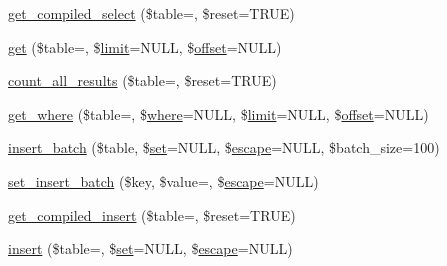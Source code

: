 \begin{DoxyCompactItemize}
\item 
\mbox{\hyperlink{class_c_i___d_b__query__builder_a0c676ca7dd63a7c77741a154e9acf936}{get\+\_\+compiled\+\_\+select}} (\$table=\textquotesingle{}\textquotesingle{}, \$reset=T\+R\+UE)
\item 
\mbox{\hyperlink{class_c_i___d_b__query__builder_a2e2e9087b1d03de3f39b4167f85e7721}{get}} (\$table=\textquotesingle{}\textquotesingle{}, \$\mbox{\hyperlink{class_c_i___d_b__query__builder_a1b72e2941924e573f5efb95f8dbc9815}{limit}}=N\+U\+LL, \$\mbox{\hyperlink{class_c_i___d_b__query__builder_a20768a139b4c62547f6fb4b55d5c734f}{offset}}=N\+U\+LL)
\item 
\mbox{\hyperlink{class_c_i___d_b__query__builder_aa686896c05027f6c8fe09b2da750357f}{count\+\_\+all\+\_\+results}} (\$table=\textquotesingle{}\textquotesingle{}, \$reset=T\+R\+UE)
\item 
\mbox{\hyperlink{class_c_i___d_b__query__builder_a95fc7bf89bf11f501b9cdba3c475e23c}{get\+\_\+where}} (\$table=\textquotesingle{}\textquotesingle{}, \$\mbox{\hyperlink{class_c_i___d_b__query__builder_ac72023dbd400394f3a2f46c5df578713}{where}}=N\+U\+LL, \$\mbox{\hyperlink{class_c_i___d_b__query__builder_a1b72e2941924e573f5efb95f8dbc9815}{limit}}=N\+U\+LL, \$\mbox{\hyperlink{class_c_i___d_b__query__builder_a20768a139b4c62547f6fb4b55d5c734f}{offset}}=N\+U\+LL)
\item 
\mbox{\hyperlink{class_c_i___d_b__query__builder_a71bae775c954d03c320de072bf5e3a65}{insert\+\_\+batch}} (\$table, \$\mbox{\hyperlink{class_c_i___d_b__query__builder_ac895a54db4870f128d0ef2426e4c282f}{set}}=N\+U\+LL, \$\mbox{\hyperlink{class_c_i___d_b__driver_a75beb60cdd3ee1875646d729963f5f5f}{escape}}=N\+U\+LL, \$batch\+\_\+size=100)
\item 
\mbox{\hyperlink{class_c_i___d_b__query__builder_ad79818e227912b140faa30c7ad6015aa}{set\+\_\+insert\+\_\+batch}} (\$key, \$value=\textquotesingle{}\textquotesingle{}, \$\mbox{\hyperlink{class_c_i___d_b__driver_a75beb60cdd3ee1875646d729963f5f5f}{escape}}=N\+U\+LL)
\item 
\mbox{\hyperlink{class_c_i___d_b__query__builder_af6312c5cd6fc7434ccf0059281fcc490}{get\+\_\+compiled\+\_\+insert}} (\$table=\textquotesingle{}\textquotesingle{}, \$reset=T\+R\+UE)
\item 
\mbox{\hyperlink{class_c_i___d_b__query__builder_a499da3fcfbfb23fda9e78c152f4fd3f4}{insert}} (\$table=\textquotesingle{}\textquotesingle{}, \$\mbox{\hyperlink{class_c_i___d_b__query__builder_ac895a54db4870f128d0ef2426e4c282f}{set}}=N\+U\+LL, \$\mbox{\hyperlink{class_c_i___d_b__driver_a75beb60cdd3ee1875646d729963f5f5f}{escape}}=N\+U\+LL)

\end{DoxyCompactItemize}
